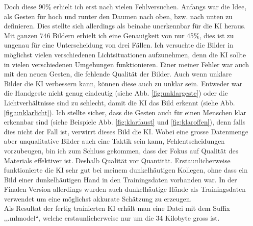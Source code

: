 \documentclass[12pt]{article}
\begin{document}
Doch diese 90\% erhielt ich erst nach vielen Fehlversuchen. Anfangs war die Idee, als Gesten für hoch und runter den Daumen nach oben, bzw. nach unten zu definieren. Dies stellte sich allerdings als beinahe unerkennbar für die KI heraus. Mit ganzen 746 Bildern erhielt ich eine Genauigkeit von nur 45\%, dies ist zu ungenau für eine Unterscheidung von drei Fällen. Ich versuchte die Bilder in möglichst vielen verschiedenen Lichtsituationen aufzunehmen, denn die KI sollte in vielen verschiedenen Umgebungen funktionieren. Einer meiner Fehler war auch mit den neuen Gesten, die fehlende Qualität der Bilder. Auch wenn unklare Bilder die KI verbessern kann, können diese auch zu unklar sein. Entweder war die Handgeste nicht genug eindeutig (siehe Abb. \ref{fig:unklargeste}) oder die Lichtverhältnisse sind zu schlecht, damit die KI das Bild erkennt (siehe Abb. \ref{fig:unklarlicht}). Ich stellte sicher, dass die Gesten auch für einen Menschen klar erkennbar sind (siehe Beispiele Abb. \ref{fig:klarfaust} und \ref{fig:klaroffen}), denn falls dies nicht der Fall ist, verwirrt dieses Bild die KI. Wobei eine grosse Datenmenge aber unqualitative Bilder auch eine Taktik sein kann, Fehlentscheidungen vorzubeugen, bin ich zum Schluss gekommen, dass der Fokus auf Qualität des Materials effektiver ist. Deshalb Qualität vor Quantität. Erstaunlicherweise funktionierte die KI sehr gut bei meinem dunkelhäutigen Kollegen, ohne dass ein Bild einer dunkelhäutigen Hand in den Trainingsdaten vorhanden war. In der Finalen Version allerdings wurden auch dunkelhäutige Hände als Trainingsdaten verwendet um eine möglichst akkurate Schätzung zu erzeugen. \\ Als Resultat der fertig trainierten KI erhält man eine Datei mit dem Suffix ,,.mlmodel``, welche erstaunlicherweise nur um die 34 Kilobyte gross ist.
\end{document}
